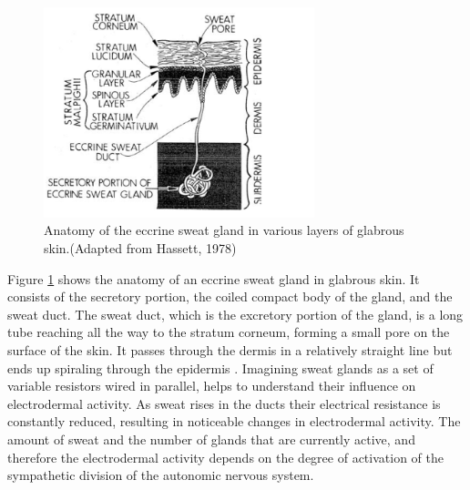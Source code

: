 \begin{figure}[ht]
\centering
\includegraphics[width=0.7\textwidth]{images/skinAnatomy.png}
\caption{Anatomy of the eccrine sweat gland in various layers of glabrous skin.(Adapted from Hassett, 1978)}
\label{layerImg}
\end{figure}

Figure \ref{layerImg} shows the anatomy of an eccrine sweat gland in glabrous skin. It consists of the  secretory portion, the coiled compact body of the gland, and the sweat duct. The sweat duct, which is the excretory portion of the gland, is a long tube reaching all the way to the stratum corneum, forming a small pore on the surface of the skin. It passes through the dermis in a relatively straight line but ends up spiraling through the epidermis \cite{HANDBOOKPP}. Imagining sweat glands as a set of variable resistors wired in parallel, helps to understand their influence on electrodermal activity. As sweat rises in the ducts their electrical resistance is constantly reduced, resulting in noticeable changes in electrodermal activity. The amount of sweat and the number of glands that are currently active, and therefore the electrodermal activity depends on the degree of activation of the sympathetic division of the autonomic nervous system.

%

